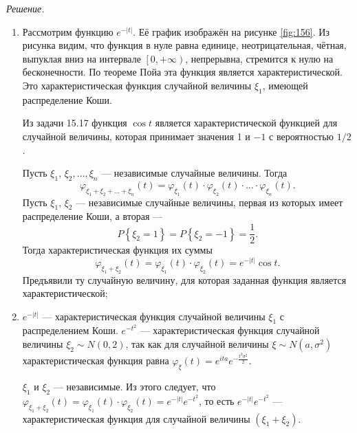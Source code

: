 \textit{Решение.}
\begin{enumerate}[label=\alph*)]
\item Рассмотрим функцию $e^{- \left| t \right| }$.
Её график изображён на рисунке \ref{fig:156}.
Из рисунка видим, что функция в нуле равна единице, неотрицательная, чётная,
выпуклая вниз на интервале $ \left[ 0, + \infty \right) $, непрерывна,
стремится к нулю на бесконечности.
По теореме Пойа эта функция является характеристической.
Это характеристическая функция случайной величины $ \xi_1$, имеющей распределение Коши.

Из задачи 15.17 функция $ \cos t$ является характеристической функцией для случайной величины,
которая принимает значения 1 и $- 1$ с вероятностью $1 / 2$.

Пусть $ \xi_1, \, \xi_2, \dotsc, \xi_n$ --- независимые случайные величины.
Тогда
$$ \varphi_{ \xi_1 + \xi_2 + \dotsc + \xi_n} \left( t \right) =
  \varphi_{ \xi_1} \left( t \right) \cdot \varphi_{ \xi_2} \left( t \right) \cdot \dotsc \cdot
  \varphi_{ \xi_n} \left( t \right).$$
Пусть $ \xi_1, \, \xi_2$ --- независимые случайные величины,
первая из которых имеет распределение Коши, а вторая ---
$$P \left\{ \xi_2 = 1 \right\} =
  P \left\{ \xi_2 = - 1 \right\} =
  \frac{1}{2}.$$
Тогда характеристическая функция их суммы
$$ \varphi_{ \xi_1 + \xi_2} \left( t \right) =
  \varphi_{ \xi_1} \left( t \right) \cdot \varphi_{ \xi_2} \left( t \right) =
  e^{- \left| t \right| } \cos t.$$
Предъявили ту случайную величину, для которая заданная функция является характеристической;
\item $e^{- \left| t \right| }$ ---
характеристическая функция случайной величины $ \xi_1$ с распределением Коши.
$e^{- t^2}$ --- характеристическая функция случайной величины $ \xi_2 \sim N \left( 0, 2 \right) $,
так как для случайной величины $ \xi \sim N \left( a, \sigma^2 \right) $
характеристическая функция равна
$ \varphi_{ \xi } \left( t \right) =
  e^{ita}e^{- \frac{t^2 \sigma^2}{2}}$.

$ \xi_1$ и $ \xi_2$ --- независимые.
Из этого следует,
что
$ \varphi_{ \xi_1 + \xi_2} \left( t \right) =
  \varphi_{ \xi_1} \left( t \right) \cdot \varphi_{ \xi_2} \left( t \right) =
  e^{- \left| t \right| } e^{- t^2}$,
то есть $e^{- \left| t \right| } e^{- t^2}$ ---
характеристическая функция для случайной величины $ \left( \xi_1 + \xi_2 \right) $.


\end{enumerate}
